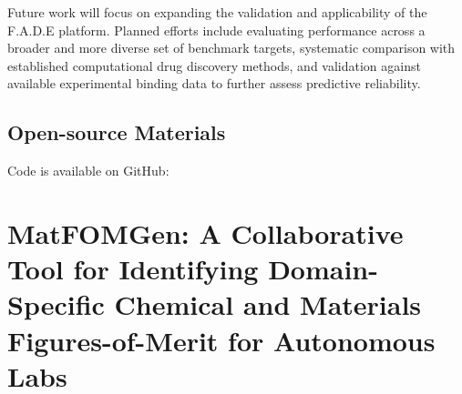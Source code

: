 Future work will focus on expanding the validation and applicability of the F.A.D.E platform. Planned efforts include evaluating performance across a broader and more diverse set of benchmark targets, systematic comparison with established computational drug discovery methods, and validation against available experimental binding data to further assess predictive reliability.


\subsection*{Open-source Materials}

Code is available on GitHub:  








\section{MatFOMGen: A Collaborative Tool for Identifying Domain-Specific Chemical and Materials Figures-of-Merit for Autonomous Labs}

